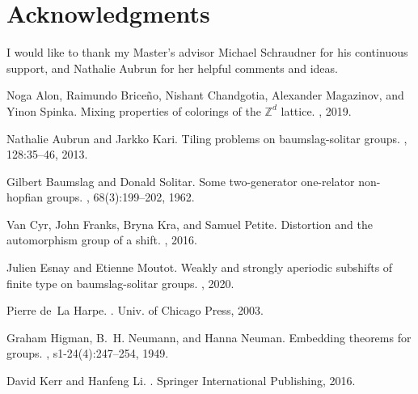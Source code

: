 \documentclass{aims}
\theoremstyle{definition}
\begin{document}

	\section*{Acknowledgments} I would like to thank my Master's advisor Michael Schraudner for his continuous support, and Nathalie Aubrun for her helpful comments and ideas.
	
	
	\begin{thebibliography}{10}
		
		Noga Alon, Raimundo Brice{\~n}o, Nishant Chandgotia, Alexander Magazinov, and
		Yinon Spinka.
		\newblock Mixing properties of colorings of the {$\mathbb{Z}^{d}$} lattice.
		, 2019.
		
		Nathalie Aubrun and Jarkko Kari.
		\newblock Tiling problems on baumslag-solitar groups.
		,
		128:35–46, 2013.
		
		Gilbert Baumslag and Donald Solitar.
		\newblock Some two-generator one-relator non-hopfian groups.
		, 68(3):199–202,
		1962.
		
		Van Cyr, John Franks, Bryna Kra, and Samuel Petite.
		\newblock Distortion and the automorphism group of a shift.
		, 2016.
		
		Julien Esnay and Etienne Moutot.
		\newblock Weakly and strongly aperiodic subshifts of finite type on
		baumslag-solitar groups.
		, 2020.
		
		Pierre de~La Harpe.
		.
		\newblock Univ. of Chicago Press, 2003.
		
		Graham Higman, B.~H. Neumann, and Hanna Neuman.
		\newblock Embedding theorems for groups.
		, s1-24(4):247--254,
		1949.
		
		David Kerr and Hanfeng Li.
		.
		\newblock Springer International Publishing, 2016.
		

\end{thebibliography}
\end{document}
